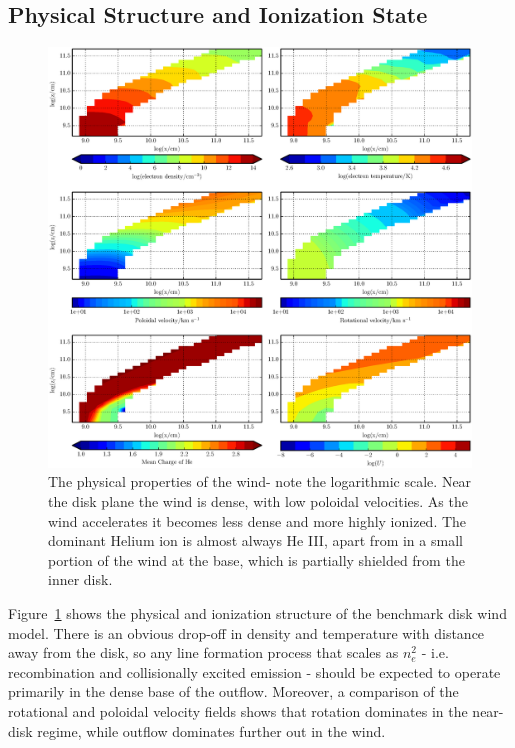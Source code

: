 \documentclass[preprint, a4paper, 11pt]{aastex}
\begin{document}
\subsection{Physical Structure and Ionization State}
\label{modela_ionization}

\begin{figure} %
\includegraphics[width=\textwidth]{figures/fig5.eps}
\caption{
The physical properties of the wind- note the logarithmic scale. 
Near the disk plane the wind is dense, with low poloidal velocities.
As the wind accelerates it becomes less dense
and more highly ionized. The dominant Helium ion
is almost always He III, apart from in a small
portion of the wind at the base, which is partially shielded
from the inner disk.
}
\label{wind}
\end{figure} %

Figure~\ref{wind} shows the physical and ionization structure 
of the benchmark disk wind model. There is an obvious drop-off in density
and temperature with distance away from the disk, so any line
formation process that scales as $n_e^2$ - i.e. recombination and
collisionally excited emission - should be expected to operate
primarily in the dense base of the outflow. Moreover, a comparison of
the rotational and poloidal velocity fields shows that rotation
dominates in the near-disk regime, while outflow dominates further out
in the wind. 
\end{document}

